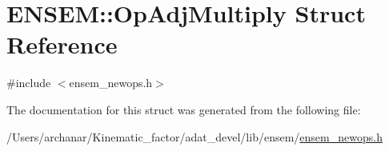 \hypertarget{structENSEM_1_1OpAdjMultiply}{}\section{E\+N\+S\+EM\+:\+:Op\+Adj\+Multiply Struct Reference}
\label{structENSEM_1_1OpAdjMultiply}


{\ttfamily \#include $<$ensem\+\_\+newops.\+h$>$}



The documentation for this struct was generated from the following file\+:\begin{DoxyCompactItemize}
\item 
/\+Users/archanar/\+Kinematic\+\_\+factor/adat\+\_\+devel/lib/ensem/\mbox{\hyperlink{lib_2ensem_2ensem__newops_8h}{ensem\+\_\+newops.\+h}}\end{DoxyCompactItemize}
